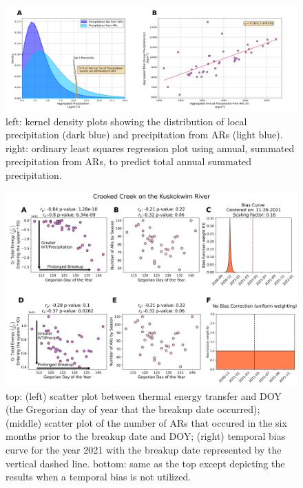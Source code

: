 \documentclass[12pts,draft]{AR_analysis_}
\begin{document}
\begin{figure}
\centering
\includegraphics[width=1.0\textwidth]{./images/concatenated_precip_var_plots.png}
\caption{left: kernel density plots showing the distribution of
	local precipitation (dark blue) and precipitation from ARs
	(light blue). right: ordinary least squares regression plot
	using annual, summated precipitation from ARs, to predict total annual
	summated precipitation.}
\label{fig:concatenated_precip_var_plots}
\end{figure}

\begin{figure}[H]
\centering
\includegraphics[width=1.0\textwidth]{./images/concatenated_scatter_bias_plots.png}
	\caption{top: (left) scatter plot between thermal energy
	transfer and DOY (the Gregorian day of year
	that the breakup date occurred); (middle) scatter plot of the number of ARs
	that occured in the six months prior to the breakup date and
	DOY; 
	(right) temporal bias curve for the year 2021 with the breakup
	date represented by the vertical dashed line. bottom: same as
	the top except depicting the results when a temporal bias
	is not utilized.}
\label{fig:concatenated_corr_plots}
\end{figure}
\end{document}
